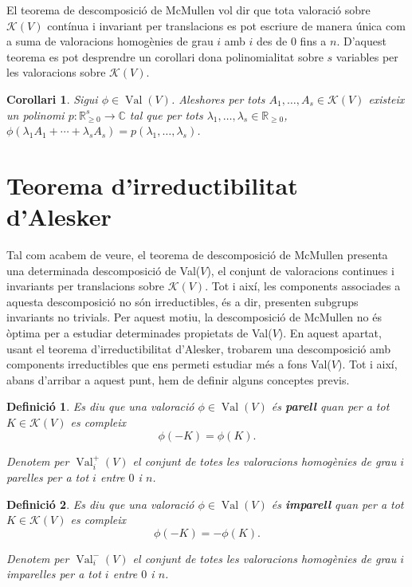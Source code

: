 \documentclass{article}
\newtheorem{corollari}{Corol\textperiodcentered lari}
\newtheorem{definicio}{Definici\'{o}}
\theoremstyle{definition}
\DeclareMathOperator{\Val}{Val}
\begin{document}
El teorema de descomposici\'{o} de McMullen vol dir que tota valoraci\'{o} sobre $\mathcal{K}(V)$ cont\'{i}nua i invariant per translacions es pot escriure de manera \'{u}nica com a suma de valoracions homog\`{e}nies de grau $i$ amb $i$ des de $0$ fins a $n$. D'aquest teorema es pot desprendre un corol\textperiodcentered lari dona polinomialitat sobre $s$ variables per les valoracions sobre $\mathcal{K}(V)$.

\begin{corollari}\label{Cor:McCullen}
Sigui $\phi\in\Val(V)$. Aleshores per tots $A_1,\ldots,A_s\in\mathcal{K}(V)$ existeix un polinomi $p:\mathbb{R}_{\geq0}^s\rightarrow\mathbb{C}$ tal que per tots $\lambda_1,\ldots,\lambda_s\in\mathbb{R}_{\geq0}$, $\phi(\lambda_1A_1+\cdots+\lambda_sA_s)=p(\lambda_1,\ldots,\lambda_s)$.
\end{corollari}

\section{Teorema d'irreductibilitat d'Alesker}

Tal com acabem de veure, el teorema de descomposici\'{o} de McMullen presenta una determinada descomposici\'{o} de Val($V$), el conjunt de valoracions continues i invariants per translacions sobre $\mathcal{K}(V)$. Tot i aix\'{i}, les components associades a aquesta descomposici\'{o} no s\'{o}n irreductibles, \'{e}s a dir, presenten subgrups invariants no trivials. Per aquest motiu, la descomposici\'{o} de McMullen no \'{e}s \`{o}ptima per a estudiar determinades propietats de Val($V$). En aquest apartat, usant el teorema d'irreductibilitat d'Alesker, trobarem una descomposici\'{o} amb components irreductibles que ens permeti estudiar m\'{e}s a fons Val($V$). Tot i aix\'{i}, abans d'arribar a aquest punt, hem de definir alguns conceptes previs.

\begin{definicio}\label{Def:parell}
Es diu que una valoraci\'{o} $\phi\in \Val(V)$ \'{e}s \textbf{parell} quan per a tot $K\in\mathcal{K}(V)$ es compleix
\[\phi(-K)=\phi(K).\]

Denotem per $\Val_i^+(V)$ el conjunt de totes les valoracions homog\`{e}nies de grau $i$ parelles per a tot $i$ entre $0$ i $n$.
\end{definicio}

\begin{definicio}\label{Def:imparell}
Es diu que una valoraci\'{o} $\phi\in\Val(V)$ \'{e}s \textbf{imparell} quan per a tot $K\in\mathcal{K}(V)$ es compleix
\[\phi(-K)=- \phi(K).\]

Denotem per $\Val_i^-(V)$ el conjunt de totes les valoracions homog\`{e}nies de grau $i$ imparelles per a tot $i$ entre $0$ i $n$.
\end{definicio}
\end{document}
